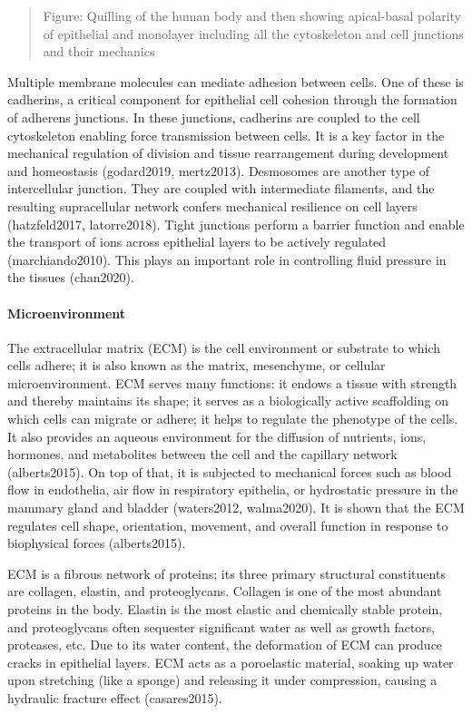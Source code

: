 \documentclass[
]{article}
\begin{document}
\begin{quote}
Figure: Quilling of the human body and then showing apical-basal
polarity of epithelial and monolayer including all the cytoskeleton and
cell junctions and their mechanics
\end{quote}

Multiple membrane molecules can mediate adhesion between cells. One of
these is cadherins, a critical component for epithelial cell cohesion
through the formation of adherens junctions. In these junctions,
cadherins are coupled to the cell cytoskeleton enabling force
transmission between cells. It is a key factor in the mechanical
regulation of division and tissue rearrangement during development and
homeostasis (godard2019, mertz2013). Desmosomes are another type of
intercellular junction. They are coupled with intermediate filaments,
and the resulting supracellular network confers mechanical resilience on
cell layers (hatzfeld2017, latorre2018). Tight junctions perform a
barrier function and enable the transport of ions across epithelial
layers to be actively regulated (marchiando2010). This plays an
important role in controlling fluid pressure in the tissues (chan2020).

\hypertarget{microenvironment}{%
\paragraph{Microenvironment}\label{microenvironment}}

The extracellular matrix (ECM) is the cell environment or substrate to
which cells adhere; it is also known as the matrix, mesenchyme, or
cellular microenvironment. ECM serves many functions: it endows a tissue
with strength and thereby maintains its shape; it serves as a
biologically active scaffolding on which cells can migrate or adhere; it
helps to regulate the phenotype of the cells. It also provides an
aqueous environment for the diffusion of nutrients, ions, hormones, and
metabolites between the cell and the capillary network (alberts2015). On
top of that, it is subjected to mechanical forces such as blood flow in
endothelia, air flow in respiratory epithelia, or hydrostatic pressure
in the mammary gland and bladder (waters2012, walma2020). It is shown
that the ECM regulates cell shape, orientation, movement, and overall
function in response to biophysical forces (alberts2015).

ECM is a fibrous network of proteins; its three primary structural
constituents are collagen, elastin, and proteoglycans. Collagen is one
of the most abundant proteins in the body. Elastin is the most elastic
and chemically stable protein, and proteoglycans often sequester
significant water as well as growth factors, proteases, etc. Due to its
water content, the deformation of ECM can produce cracks in epithelial
layers. ECM acts as a poroelastic material, soaking up water upon
stretching (like a sponge) and releasing it under compression, causing a
hydraulic fracture effect (casares2015).
\end{document}
